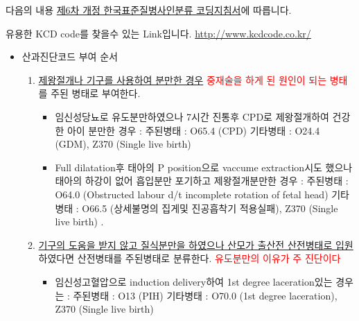 \par
 다음의 내용 \href{http://kostat.go.kr/kssc/common/CommonAction.do?method=download&attachDir=bm90aWNl&attachName=JUVEJTk1JTlDJUVBJUI1JUFEJUVEJTkxJTlDJUVDJUE0JTgwJUVDJUE3JTg4JUVCJUIzJTkxJUVDJTgyJUFDJUVDJTlEJUI4JUVCJUI2JTg0JUVCJUE1JTk4XyVFQyVBNyU4OCVFQiVCMyU5MSVFQyVCRCU5NCVFQiU5NCVBOSVFQyVBNyU4MCVFQyVCOSVBOCVFQyU4NCU5QyUyODIwMTIuMDMlMjkucGRm}{제6차 개정 한국표준질병사인분류 코딩지침서}에 따릅니다.\par
유용한 KCD code를 찾을수 있는 Link입니다. \url{http://www.kcdcode.co.kr/}
\begin{itemize}[▷]\tightlist
\item 산과진단코드 부여 순서
	\begin{enumerate}\tightlist
	\item \uline{제왕절개나 기구를 사용하여 분만한 경우} \textcolor{red}{중재술을 하게 된 원인이 되는 병태}를 주된 병태로 부여한다.
		\begin{mdframed}[linecolor=blue,middlelinewidth=2]
			\begin{itemize}\tightlist
			\item 임신성당뇨로 유도분만하였으나 7시간 진통후 CPD로 제왕절개하여 건강한 아이 분만한 경우 :  주된병태 : O65.4 (CPD) 기타병태 : O24.4 (GDM), Z370 (Single live birth) 
			\item Full dilatation후 태아의 P position으로 vaccume extraction시도 했으나 태아의 하강이 없어 흡입분만 포기하고 제왕절개분만한 경우 :  주된병태 : O64.0 (Obstructed labour d/t incomplete rotation of fetal head) 기타병태 : O66.5 (상세불명의 집게및 진공흡착기 적용실패), Z370 (Single live birth) .
			
			\end{itemize}
		\end{mdframed}
	\item \uline{기구의 도움을 받지 않고 질식분만을 하였으나 산모가 출산전 산전병태로 입원}하였다면 산전병태를 주된병태로 분류한다. \textcolor{red}{유도분만의 이유가 주 진단이다}
		\begin{mdframed}[linecolor=blue,middlelinewidth=2]
		\begin{itemize}\tightlist
		\item 임신성고혈압으로 induction delivery하여 1st degree laceration있는 경우는  : 주된병태 : O13 (PIH) 기타병태 : O70.0 (1st degree laceration), Z370 (Single live birth) 
		\end{itemize}
		\end{mdframed}
		

\end{enumerate}
\end{itemize}
